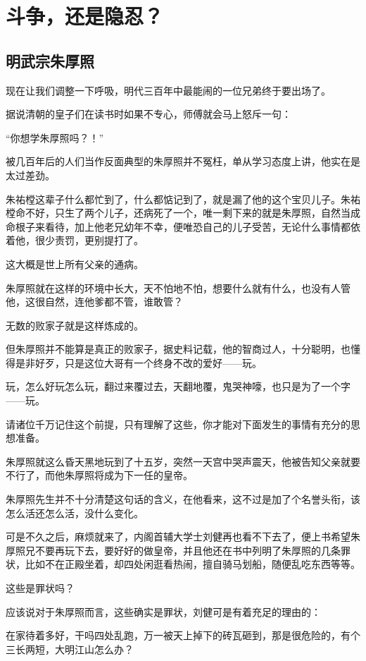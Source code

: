 \section{斗争，还是隐忍？}
\ifnum{}
	\begin{multicols}{\theparacolNo}
\fi
\subsection{明武宗朱厚照}
现在让我们调整一下呼吸，明代三百年中最能闹的一位兄弟终于要出场了。

据说清朝的皇子们在读书时如果不专心，师傅就会马上怒斥一句：

“你想学朱厚照吗？！”

被几百年后的人们当作反面典型的朱厚照并不冤枉，单从学习态度上讲，他实在是太过差劲。

朱祐樘这辈子什么都忙到了，什么都惦记到了，就是漏了他的这个宝贝儿子。朱祐樘命不好，只生了两个儿子，还病死了一个，唯一剩下来的就是朱厚照，自然当成命根子来看待，加上他老兄幼年不幸，便唯恐自己的儿子受苦，无论什么事情都依着他，很少责罚，更别提打了。

这大概是世上所有父亲的通病。

朱厚照就在这样的环境中长大，天不怕地不怕，想要什么就有什么，也没有人管他，这很自然，连他爹都不管，谁敢管？

无数的败家子就是这样炼成的。

但朱厚照并不能算是真正的败家子，据史料记载，他的智商过人，十分聪明，也懂得是非好歹，只是这位大哥有一个终身不改的爱好——玩。

玩，怎么好玩怎么玩，翻过来覆过去，天翻地覆，鬼哭神嚎，也只是为了一个字——玩。

请诸位千万记住这个前提，只有理解了这些，你才能对下面发生的事情有充分的思想准备。

朱厚照就这么昏天黑地玩到了十五岁，突然一天宫中哭声震天，他被告知父亲就要不行了，而他朱厚照将成为下一任的皇帝。

朱厚照先生并不十分清楚这句话的含义，在他看来，这不过是加了个名誉头衔，该怎么活还怎么活，没什么变化。

可是不久之后，麻烦就来了，内阁首辅大学士刘健再也看不下去了，便上书希望朱厚照兄不要再玩下去，要好好的做皇帝，并且他还在书中列明了朱厚照的几条罪状，比如不在正殿坐着，却四处闲逛看热闹，擅自骑马划船，随便乱吃东西等等。

这些是罪状吗？

应该说对于朱厚照而言，这些确实是罪状，刘健可是有着充足的理由的：

在家待着多好，干吗四处乱跑，万一被天上掉下的砖瓦砸到，那是很危险的，有个三长两短，大明江山怎么办？


\end{multicols}
